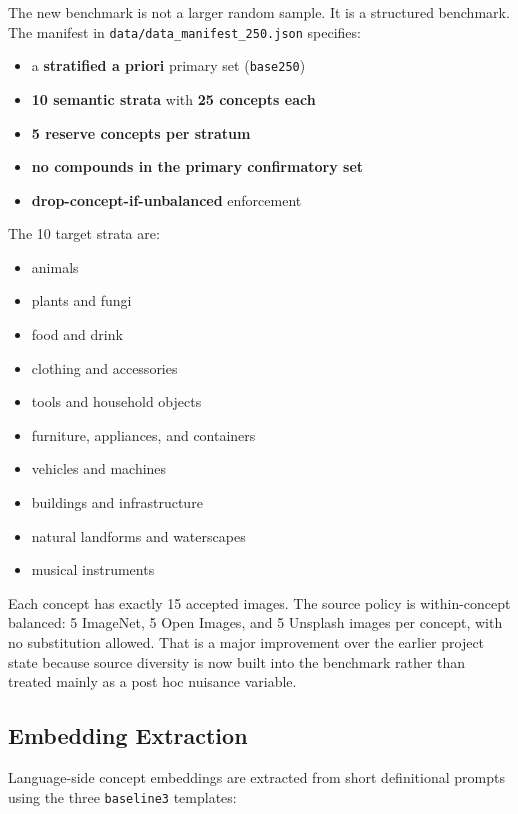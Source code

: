 \documentclass[10pt]{article}
\providecommand{\tightlist}{%
  \setlength{\itemsep}{0pt}\setlength{\parskip}{0pt}}
\begin{document}
The new benchmark is not a larger random sample. It is a structured
benchmark. The manifest in \texttt{data/data\_manifest\_250.json}
specifies:

\begin{itemize}
\tightlist
\item
  a \textbf{stratified a priori} primary set (\texttt{base250})
\item
  \textbf{10 semantic strata} with \textbf{25 concepts each}
\item
  \textbf{5 reserve concepts per stratum}
\item
  \textbf{no compounds in the primary confirmatory set}
\item
  \textbf{drop-concept-if-unbalanced} enforcement
\end{itemize}

The 10 target strata are:

\begin{itemize}
\tightlist
\item
  animals
\item
  plants and fungi
\item
  food and drink
\item
  clothing and accessories
\item
  tools and household objects
\item
  furniture, appliances, and containers
\item
  vehicles and machines
\item
  buildings and infrastructure
\item
  natural landforms and waterscapes
\item
  musical instruments
\end{itemize}

Each concept has exactly 15 accepted images. The source policy is
within-concept balanced: 5 ImageNet, 5 Open Images, and 5 Unsplash
images per concept, with no substitution allowed. That is a major
improvement over the earlier project state because source diversity is
now built into the benchmark rather than treated mainly as a post hoc
nuisance variable.

\subsection{Embedding Extraction}\label{embedding-extraction}

Language-side concept embeddings are extracted from short definitional
prompts using the three \texttt{baseline3} templates:
\end{document}
